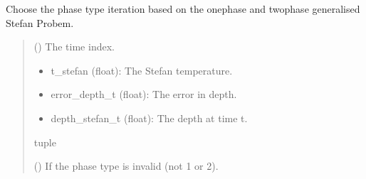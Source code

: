 \documentclass[a4paper,11pt,english,openany]{sphinxmanual}
\begin{document}
\begin{fulllineitems}

\begin{fulllineitems}
\label{\detokenize{api/spyice.models.sea_ice_model:src.spyice.models.sea_ice_model.SeaIceModel.choose_phase_type_iteration}}
\pysigstartsignatures
\pysiglinewithargsret
{}
{}
{}
\pysigstopsignatures
\sphinxAtStartPar
Choose the phase type iteration based on the one\sphinxhyphen{}phase and two\sphinxhyphen{}phase generalised Stefan Probem.
\begin{quote}\begin{description}
\sphinxAtStartPar
{} () \textendash{} The time index.

\sphinxAtStartPar
\begin{description}
\begin{itemize}
\item {} 
\sphinxAtStartPar
t\_stefan (float): The Stefan temperature.

\item {} 
\sphinxAtStartPar
error\_depth\_t (float): The error in depth.

\item {} 
\sphinxAtStartPar
depth\_stefan\_t (float): The depth at time t.

\end{itemize}

\end{description}


\sphinxAtStartPar
tuple

\sphinxAtStartPar
{\hyperref[\detokenize{api/spyice.utils.spyice_exceptions:src.spyice.utils.spyice_exceptions.InvalidPhaseError}]{}} () \textendash{} If the phase type is invalid (not 1 or 2).

\end{description}\end{quote}


\end{fulllineitems}
\end{fulllineitems}
\end{document}
